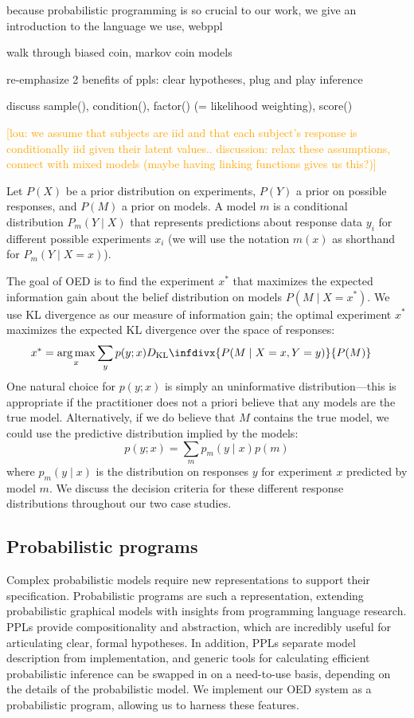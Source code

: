 \documentclass{article}
\newcommand{\dkl}{D_\mathrm{KL}\infdivx}
\newcommand{\lou}[1]{\textcolor{orange}{[lou: #1]}}
\newcommand{\cas}[1]{ \textsf{\color{darkgray} \scriptsize #1} }
\DeclareMathOperator*{\argmax}{arg\,max}
\begin{document}
\cas{because probabilistic programming is so crucial to our work, we give an introduction to the language we use, webppl}

\cas{walk through biased coin, markov coin models}

\cas{re-emphasize 2 benefits of ppls: clear hypotheses, plug and play inference}

\cas{discuss sample(), condition(), factor() (= likelihood weighting), score()}

\lou{we assume that subjects are iid and that each subject's response is conditionally iid given their latent values.. discussion: relax these assumptions, connect with mixed models (maybe having linking functions gives us this?)}

Let $P(X)$ be a prior distribution on experiments, $P(Y)$ a prior on possible responses, and $P(M)$ a prior on models.
A model $m$ is a conditional distribution $P_m(Y \mid X)$ that represents predictions about response data $y_i$ for different possible experiments $x_i$ (we will use the notation $m(x)$ as shorthand for $P_m(Y \mid X = x)$).

The goal of OED is to find the experiment $x^{*}$ that maximizes the expected information gain about the belief distribution on models $P(M \mid X = x^{*})$.
We use KL divergence as our measure of information gain; the optimal experiment $x^*$ maximizes the expected KL divergence over the space of responses:
\begin{align}
x^{*} &= \argmax_{x} \sum\limits_{y} p(y ; x) \dkl{ P(M \mid X = x, Y = y) }{ P(M) } \label{eq:oed}
\end{align}
One natural choice for $p(y ; x)$ is simply an uninformative distribution---this is appropriate if the practitioner does not a priori believe that any models are the true model.
Alternatively, if we do believe that $M$ contains the true model, we could use the predictive distribution implied by the models:
$$ p(y ; x) = \sum\limits_{m}p_m(y \mid x)p(m) $$
where $p_m(y \mid x)$ is the distribution on responses $y$ for experiment $x$ predicted by model $m$.
We discuss the decision criteria for these different response distributions throughout our two case studies.

\subsection{Probabilistic programs}

Complex probabilistic models require new representations to support their specification. Probabilistic programs are such a representation, extending probabilistic graphical models with insights from programming language research.
PPLs provide compositionality and abstraction, which are incredibly useful for articulating clear, formal hypotheses. In addition, PPLs separate model description from implementation, and generic tools for calculating efficient probabilistic inference can be swapped in on a need-to-use basis, depending on the details of the probabilistic model.
We implement our OED system as a probabilistic program, allowing us to harness these features.
\end{document}
